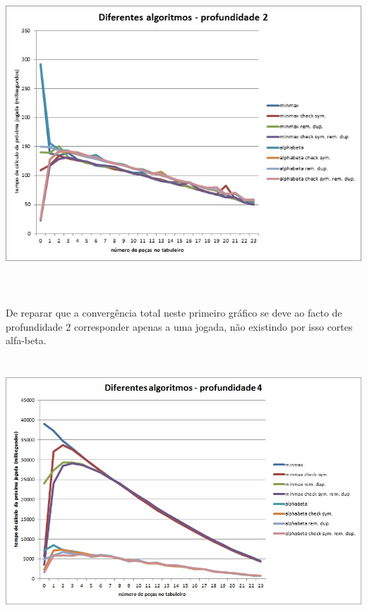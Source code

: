 \begin{table}[H]
\centering
\includegraphics[height=12cm]{performance/tempPerfComparisonDepth2.jpg}
\end{table}

De reparar que a convergência total neste primeiro gráfico se deve ao facto de profundidade 2 corresponder apenas a uma jogada, não existindo por isso cortes alfa-beta.

\begin{table}[H]
\centering
\includegraphics[height=10cm]{performance/tempPerfComparisonDepth4.jpg}
\end{table}

